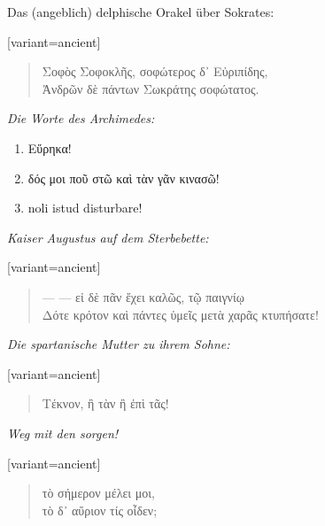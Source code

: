 Das (angeblich) delphische Orakel über Sokrates:
\begin{greek}[variant=ancient]%
\begin{quote}
Σοφὸς Σοφοκλῆς, σοφώτερος δ᾽ Εὐριπίδης,\\
Ἀνδρῶν δὲ πάντων Σωκράτης σοφώτατος. 

\end{quote}
\end{greek}%
\noindent \begin{center}
\emph{Die Worte des Archimedes:}
\par\end{center}
\begin{enumerate}
\item \textgreek[variant=ancient]{Εὕρηκα!}
\item \textgreek[variant=ancient]{δός μοι ποῦ στῶ καὶ τὰν γᾶν κινασῶ! }
\item \textlatin{noli istud disturbare!}
\end{enumerate}
\noindent \begin{center}
\emph{Kaiser Augustus auf dem Sterbebette:}
\par\end{center}
\begin{greek}[variant=ancient]%
\begin{quote}
— — εἰ δὲ πᾶν ἔχει καλῶς, τῷ παιγνίῳ\\
Δότε κρότον καὶ πάντες ὑμεῖς μετὰ χαρᾶς κτυπήσατε! 

\end{quote}
\end{greek}%
\noindent \begin{center}
\emph{Die spartanische Mutter zu ihrem Sohne:}
\par\end{center}
\begin{greek}[variant=ancient]%
\begin{quote}
Τέκνον, ἢ τὰν ἢ ἐπὶ τᾶς!

\end{quote}
\end{greek}%
\noindent \begin{center}
\emph{Weg mit den sorgen!}
\par\end{center}
\begin{greek}[variant=ancient]%
\begin{quote}
τὸ σήμερον μέλει μοι,\\
τὸ δ᾽ αὔριον τίς οἶδεν; 

\end{quote}
\end{greek}%
